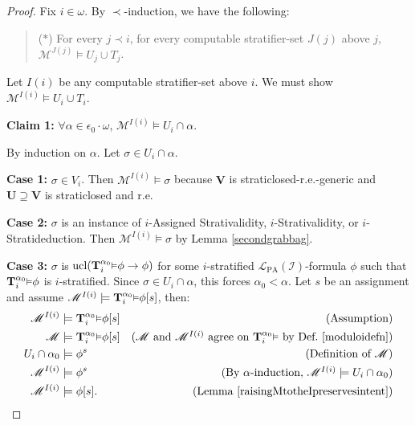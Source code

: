 \documentclass[reqno]{article}
\theoremstyle{definition}
\def\L{\mathscr{L}}
\def\M{\mathscr{M}}
\def\T{\mathbf{T}}
\def\U{\mathbf{U}}
\def\V{\mathbf{V}}
\def\LPA{\L_{\mathrm{PA}}}
\def\epom{\epsilon_0\cdot\omega}
\def\indset{\mathcal I}
\newcommand{\Prr}[2]{\T^{#1}_{#2}\mbox{\small${\vDash}$}}
\newcommand{\ucl}[1]{\mathrm{ucl}(#1)}
\newcommand{\case}[1]{\textbf{Case #1:}}
\newcommand{\claim}[1]{\textbf{Claim #1:}}
\begin{document}
\begin{proof}
Fix $i\in\omega$. By $\prec$-induction, we have the following:
\begin{quote}
($*$) For every $j\prec i$, for every computable stratifier-set $J(j)$ above
$j$, $\M^{J(j)}\models U_j\cup T_j$.
\end{quote}

Let $I(i)$ be any computable stratifier-set above $i$.
We must show $\M^{I(i)}\models U_i\cup T_i$.

\item
\claim1
$\forall \alpha\in\epom$, $\M^{I(i)}\models U_i\cap\alpha$.

\item
By induction on $\alpha$.
Let $\sigma\in U_i\cap\alpha$.

\item
\case1
$\sigma\in V_i$.
Then $\M^{I(i)}\models\sigma$ because
$\V$ is straticlosed-r.e.-generic and $\U\supseteq\V$
is straticlosed and r.e.

\item
\case2
$\sigma$ is an instance of $i$-Assigned Strativalidity, $i$-Strativalidity,
or $i$-Stratideduction.  Then $\M^{I(i)}\models\sigma$
by Lemma \ref{secondgrabbag}.

\item
\case3
$\sigma$ is $\ucl{\Prr{\alpha_0} i\phi\rightarrow\phi}$ for some
$i$-stratified $\LPA(\indset)$-formula $\phi$ such that $\Prr{\alpha_0}i\phi$ is $i$-stratified.
Since $\sigma\in U_i\cap\alpha$, this forces $\alpha_0<\alpha$.
Let $s$ be an assignment and
assume $\M^{I(i)}\models\Prr{\alpha_0}i\phi[s]$, then:
\begin{align*}
\M^{I(i)} &\models \Prr{\alpha_0} i\phi[s]
  &\mbox{(Assumption)}\\
\M &\models \Prr{\alpha_0} i\phi[s]
  &\mbox{($\M$ and $\M^{I(i)}$ agree on $\Prr{\alpha_0} i$
  by Def.\ \ref{moduloidefn})}\\
U_i\cap \alpha_0 &\models \phi^s
  &\mbox{(Definition of $\M$)}\\
\M^{I(i)} &\models \phi^s
  &\mbox{(By $\alpha$-induction, $\M^{I(i)}\models U_i\cap \alpha_0$)}\\
\M^{I(i)} &\models \phi[s].
  &\mbox{(Lemma \ref{raisingMtotheIpreservesintent})}
\end{align*}



\end{proof}
\end{document}
